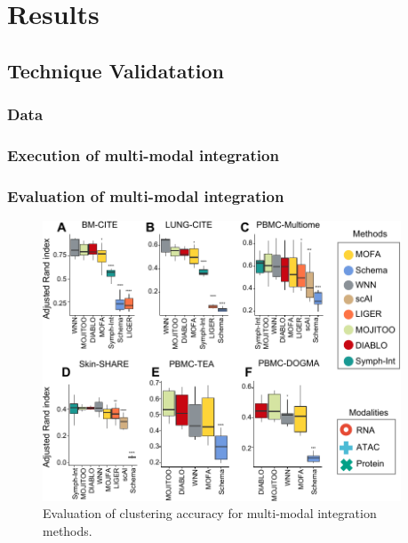 \chapter{Results}
\label{chapter:results}

\graphicspath{{chapter5/figs}}

\section{Technique Validatation}
\subsection{Data}
\subsection{Execution of multi-modal integration}
\subsection{Evaluation of multi-modal integration}


\begin{figure}[!ht]
	\centering
	\includegraphics[width=0.95\textwidth]{ari/fig}
	\vspace{0.1cm}
	\caption[Evaluation of clustering accuracy for multi-modal integration methods.]{Evaluation of clustering accuracy for multi-modal integration methods.}
	\label{fig:ari}
\end{figure}


